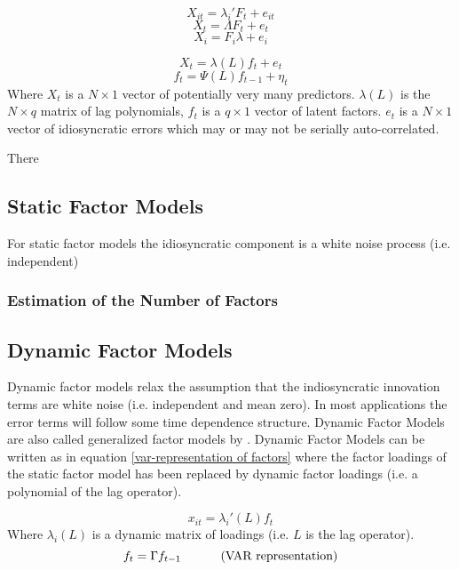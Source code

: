 \documentclass[11pt]{article}
\begin{document}
\begin{equation}
	\label{factor equation, it indexed}
	X_{it} = \lambda_i' F_t + e_{it}
\end{equation}
\begin{equation}
	\label{factor equation, t indexed}
	X_t = \Lambda F_t + e_t
\end{equation}
\begin{equation}
	\label{factor equation, i indexed}
	X_i = F_i \lambda + e_i
\end{equation}


\begin{equation}
	\label{factor equation, lag polynomial}
	X_t = \lambda(L) f_t + e_t
\end{equation}
\begin{equation}
	f_t = \Psi(L) f_{t-1} + \eta_t
\end{equation}
Where $X_t$ is a $N \times 1$ vector of potentially very many predictors. $\lambda(L)$ is the $N \times q$ matrix of lag polynomials, $f_t$ is a $q \times 1$ vector of latent factors. $e_t$ is a $N \times 1$ vector of idiosyncratic errors which may or may not be serially auto-correlated.

There 


\subsection{Static Factor Models}
For static factor models the idiosyncratic component is a white noise process (i.e. independent)

\subsubsection{Estimation of the Number of Factors}
\subsection{Dynamic Factor Models}
Dynamic factor models relax the assumption that the indiosyncratic innovation terms are white noise (i.e. independent and mean zero). In most applications the error terms will follow some time dependence structure. Dynamic Factor Models are also called generalized factor models by . Dynamic Factor Models can be written as in equation \ref{var-representation of factors} where the factor loadings of the static factor model has been replaced by dynamic factor loadings (i.e. a polynomial of the lag operator). 

\begin{equation}
	\label{var-representation of factors}
	x_{it} = \lambda_i'(L) f_t
\end{equation}
Where $\lambda_i(L)$ is a dynamic matrix of loadings (i.e. $L$ is the lag operator).
\begin{equation}
	\label{dynamic factors equation}
	f_t = \Gamma f_{t-1} \text{\hspace{1cm} (VAR representation)}
\end{equation}
\end{document}
